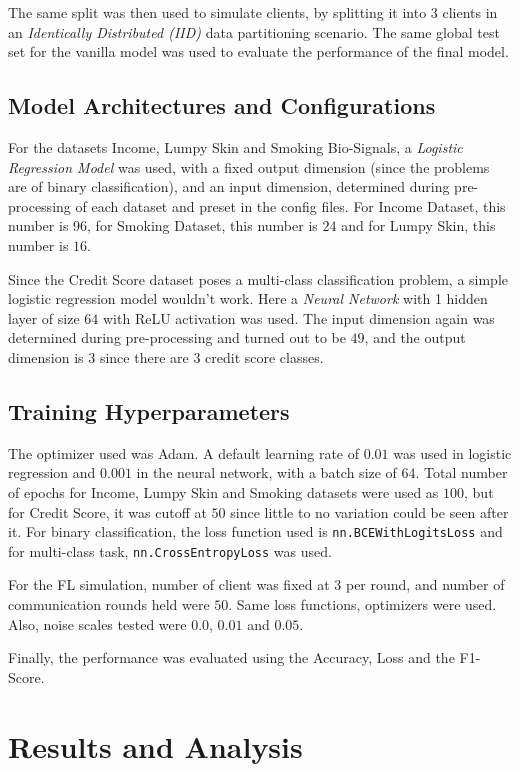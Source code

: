\documentclass[10pt,twocolumn]{article}
\begin{document}
The same split was then used to simulate clients, by splitting it into $3$ clients in an \textit{Identically Distributed (IID)} data partitioning scenario. The same global test set for the vanilla model was used to evaluate the performance of the final model. 

\subsection{Model Architectures and Configurations}
For the datasets Income, Lumpy Skin and Smoking Bio-Signals, a \textit{Logistic Regression Model} was used, with a fixed output dimension (since the problems are of binary classification), and an input dimension, determined during pre-processing of each dataset and preset in the config files. For Income Dataset, this number is $96$, for Smoking Dataset, this number is $24$ and for Lumpy Skin, this number is $16$.

Since the Credit Score dataset poses a multi-class classification problem, a simple logistic regression model wouldn't work. Here a \textit{Neural Network} with 1 hidden layer of size $64$ with ReLU activation was used. The input dimension again was determined during pre-processing and turned out to be $49$, and the output dimension is $3$ since there are $3$ credit score classes.

\subsection{Training Hyperparameters}
The optimizer used was Adam. A default learning rate of $0.01$ was used in logistic regression and $0.001$ in the neural network, with a batch size of $64$. Total number of epochs for Income, Lumpy Skin and Smoking datasets were used as $100$, but for Credit Score, it was cutoff at $50$ since little to no variation could be seen after it. For binary classification, the loss function used is \texttt{nn.BCEWithLogitsLoss} and for multi-class task, \texttt{nn.CrossEntropyLoss} was used.

For the FL simulation, number of client was fixed at $3$ per round, and number of communication rounds held were $50$. Same loss functions, optimizers were used. Also, noise scales tested were $0.0$, $0.01$ and $0.05$. 

Finally, the performance was evaluated using the Accuracy, Loss and the F1-Score.

\section{Results and Analysis}
\end{document}
